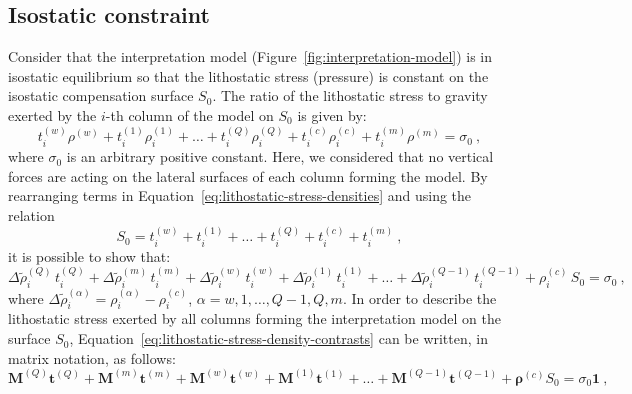 \documentclass[manuscript]{geophysics}
\begin{document}
\subsection{Isostatic constraint}

Consider that the interpretation model (Figure~\ref{fig:interpretation-model})
is in isostatic equilibrium \citep{turcotte-schubert2002, hofmann-wellenhof-moritz2005,
lowrie2007} so that the lithostatic stress (pressure) is constant on the
isostatic compensation surface $S_{0}$.
The ratio of the lithostatic stress to gravity exerted by the $i$-th 
column of the model on $S_{0}$ is given by:
\begin{equation}
t^{(w)}_{i} \rho^{(w)} + t^{(1)}_{i} \rho^{(1)}_{i} + \dots + 
t^{(Q)}_{i} \rho^{(Q)}_{i} + t^{(c)}_{i} \rho^{(c)}_{i} + t^{(m)}_{i} \rho^{(m)} 
= \sigma_{0} \: ,
\label{eq:lithostatic-stress-densities}
\end{equation}
where $\sigma_{0}$ is an arbitrary positive constant. 
Here, we considered that no vertical forces are acting on the lateral surfaces of 
each column forming the model.
By rearranging terms in Equation~\ref{eq:lithostatic-stress-densities} 
and using the relation
\begin{equation}
S_{0} = t^{(w)}_{i} + t^{(1)}_{i} + \dots + t^{(Q)}_{i} + t^{(c)}_{i} + t^{(m)}_{i} \: ,
\label{eq:S0}
\end{equation}
it is possible to show that:
\begin{equation}
\Delta \tilde{\rho}^{(Q)}_{i} \, t^{(Q)}_{i} + 
\Delta \tilde{\rho}^{(m)}_{i} \, t^{(m)}_{i} + 
\Delta \tilde{\rho}^{(w)}_{i} \, t^{(w)}_{i} + 
\Delta \tilde{\rho}^{(1)}_{i} \, t^{(1)}_{i} +
\dots + 
\Delta \tilde{\rho}^{(Q-1)}_{i} \, t^{(Q-1)}_{i} +
\rho^{(c)}_{i} \, S_{0} = \sigma_{0} \: ,
\label{eq:lithostatic-stress-density-contrasts}
\end{equation}
where $\Delta \tilde{\rho}^{(\alpha)}_{i} = \rho^{(\alpha)}_{i} - \rho^{(c)}_{i}$, 
$\alpha = w, 1, \dots, Q-1, Q, m$.
In order to describe the lithostatic stress exerted by all columns forming the
interpretation model on the surface $S_{0}$, 
Equation~\ref{eq:lithostatic-stress-density-contrasts} 
can be written, in matrix notation, as follows:
\begin{equation}
\mathbf{M}^{(Q)} \mathbf{t}^{(Q)} + \mathbf{M}^{(m)} \mathbf{t}^{(m)} + \mathbf{M}^{(w)}
\mathbf{t}^{(w)} + \mathbf{M}^{(1)} \mathbf{t}^{(1)} + \dots + \mathbf{M}^{(Q-1)}
\mathbf{t}^{(Q-1)} + \boldsymbol{\rho}^{(c)} S_{0} = \sigma_{0} \mathbf{1} \: ,
\label{eq:lithostatic-stress-matrix}
\end{equation}
\end{document}
